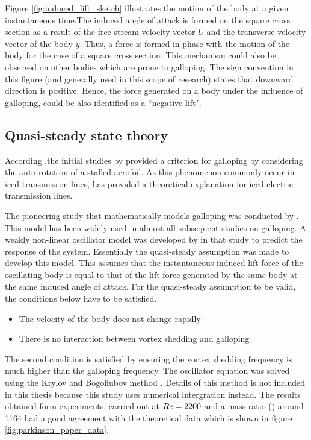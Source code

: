 

 Figure \ref{fig:induced_lift_sketch}  illustrates the motion of the body at a given instantaneous time.The induced angle of attack is formed on the square cross section as a result of the free stream velocity vector $U$ and the transverse velocity vector of the body $\dot{y}$. Thus, a force is formed in phase with the motion of the body for the case of a square cross section. This mechanism could also be observed on other bodies which are prone to galloping. The sign convention in this figure (and generally used in this scope of research) states that downward direction is positive. Hence, the force generated on a body under the influence of galloping, could be also identified as a ``negative lift".
 

\subsection{Quasi-steady state theory}
\label{sec:QSS theory}


According \cite{Paidoussis2010},the initial studies by \cite{Glauert1919} provided a criterion for galloping by considering the auto-rotation of a stalled aerofoil. As this phenomenon commonly occur in iced transmission lines, \cite{DenHartog1956} has provided a theoretical explanation for iced electric transmission lines. 

The pioneering study that mathematically models galloping was conducted by \cite{Parkinson1964}. This model has been widely used in almost all subsequent studies on galloping. A weakly non-linear oscillator model was developed by in that study to predict the response of the system. Essentially the quasi-steady assumption was made to develop this model. This assumes that the instantaneous induced lift force of the oscillating body is equal to that of the lift force generated by the same body at the same induced angle of attack. For the quasi-steady assumption to be valid, the conditions below have to be satisfied.

\begin{itemize}
 \item The velocity of the body does not change rapidly
 \item There is no interaction between vortex shedding and galloping
\end{itemize}

The second condition is satisfied by ensuring the vortex shedding frequency is much higher than the galloping frequency.
The oscillator equation was solved using the Krylov and Bogoliubov method \citep{Parkinson1964}. Details of this method is not included in this thesis because this study uses numerical intergration instead. The results obtained form experiments, carried out at $Re=2200$ and a mass ratio (\mstar) around 1164 had a good agreement with the theoretical data which is shown in figure \ref{fig:parkinson_paper_data}.

